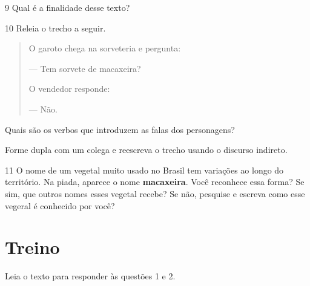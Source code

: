 \num{9} Qual é a finalidade desse texto?



\num{10} Releia o trecho a seguir.

\begin{quote}
O garoto chega na sorveteria e pergunta:

--- Tem sorvete de macaxeira?

O vendedor responde:

--- Não.
\end{quote}

\begin{escolha}[itemsep=-5pt]
\item Quais são os verbos que introduzem as falas dos personagens? 
\item{}


\item Forme dupla com um colega e reescreva o trecho usando o discurso
indireto.
\item{}
\end{escolha}

\num{11} O nome de um vegetal muito usado no Brasil tem variações ao longo do território.
Na piada, aparece o nome \textbf{macaxeira}. Você reconhece essa forma? Se sim, que outros
nomes esses vegetal recebe? Se não, pesquise e escreva como esse vegeral é conhecido por
você?


\section{Treino}

Leia o texto para responder às questões 1 e 2.


